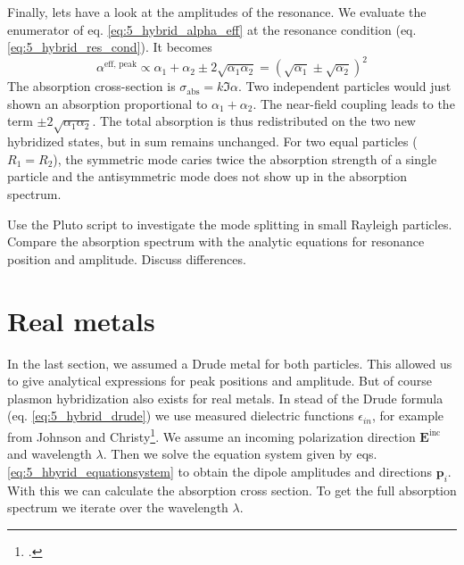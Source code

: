 Finally, lets have a look at the amplitudes of the resonance. We evaluate the enumerator of eq.  \ref{eq:5_hybrid_alpha_eff}
 at the resonance condition (eq. \ref{eq:5_hybrid_res_cond}). It becomes
 \begin{equation}
 \alpha^\text{eff, peak} \propto \alpha_1  + \alpha_2  \pm 2 \sqrt{\alpha_1 \alpha_2} = \left( \sqrt{\alpha_1}  \pm \sqrt{\alpha_2} \right)^2
\end{equation}
The absorption cross-section is $\sigma_\text{abs} = k \Im {\alpha}$. Two independent particles would just shown an absorption proportional to $\alpha_1  + \alpha_2$. The near-field coupling leads to the term $\pm 2 \sqrt{\alpha_1 \alpha_2}$. The total absorption is thus redistributed on the two new hybridized states, but in sum remains unchanged.
 For two equal particles ($R_1 = R_2$), the symmetric mode caries twice the absorption strength of a single  particle and the antisymmetric mode does not show up in the absorption spectrum. 

\begin{questions}

\item Use the Pluto script to investigate the mode splitting in small Rayleigh particles. Compare the absorption spectrum with the analytic equations for resonance position and amplitude. Discuss differences.
\end{questions}



\section{Real metals}

In the last section, we assumed a Drude metal for both particles. This allowed us to give analytical expressions for peak positions and amplitude. But of course plasmon hybridization also exists for real metals. In stead of the Drude formula (eq. \ref{eq:5_hybrid_drude}) we use measured dielectric functions $\epsilon_{in}$, for example from Johnson and Christy\footcite{JC_gold72}. We assume an incoming polarization direction $\mathbf{E}^\text{inc}$ and wavelength $\lambda$. Then we solve the equation system given by eqs. \ref{eq:5_hbyrid_equationsystem}  to obtain the dipole amplitudes and directions $\mathbf{p}_i$. With this we can calculate  the absorption cross section. To get the full absorption  spectrum we iterate over the wavelength $\lambda$.


